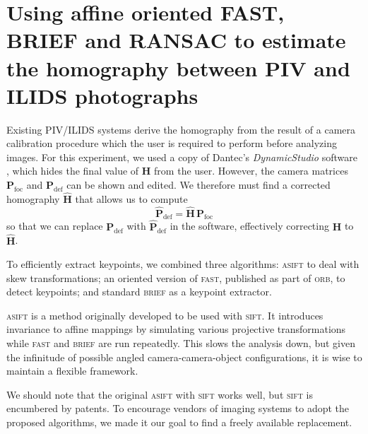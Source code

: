 \documentclass[preprint]{elsarticle}
\begin{document}
\section{Using affine oriented FAST, BRIEF and RANSAC to estimate the homography
between PIV and ILIDS photographs \label{sec:results}}

Existing PIV/ILIDS systems derive the homography from the result of a camera
calibration procedure which the user is required to perform before analyzing
images. For this experiment, we used a copy of Dantec's \emph{DynamicStudio}
software \cite{dstudio}, which hides the final value of $\mathbf{H}$ from the
user. However, the camera matrices $\mathbf{P}_\text{foc}$ and
$\mathbf{P}_\text{def}$ can be shown and edited. We therefore must find a
corrected homography $\mathbf{\hat{H}}$ that allows us to compute
\begin{equation}
    \mathbf{\hat{P}}_\text{def} = \mathbf{\hat{H}} \, \mathbf{P}_\text{foc}
    \label{corrected-homography-use}
\end{equation}
so that we can replace $\mathbf{P}_\text{def}$ with $\mathbf{\hat{P}}_\text{def}$ in
the software, effectively correcting $\mathbf{H}$ to $\mathbf{\hat{H}}$.

To efficiently extract keypoints, we combined three algorithms:
\textsc{asift} \cite{Morel09} to deal with skew transformations; an oriented version of
\textsc{fast}, published as part of \textsc{orb}, to detect keypoints; and
standard \textsc{brief} as a keypoint extractor.

\textsc{asift} is a method originally developed to be used with \textsc{sift}.
It introduces invariance to affine mappings by simulating various
projective transformations while \textsc{fast} and \textsc{brief} are run repeatedly.
This slows the analysis down, but given the infinitude of
possible angled camera-camera-object configurations, it is wise to maintain a
flexible framework.

We should note that the original \textsc{asift} with
\textsc{sift} works well, but \textsc{sift} is encumbered by patents. To
encourage vendors of imaging systems to adopt the proposed algorithms, we made
it our goal to find a freely available replacement.
\end{document}
